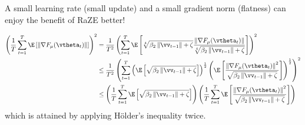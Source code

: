 


A small learning rate (small update) and a small gradient norm (flatness) can enjoy the benefit of RaZE better!


\begin{equation}
\begin{aligned}
\left(\frac{1}{T}\sum_{t=1}^T\E\left[\left\|\nabla
F_{\mu}(\vtheta_t)\right\|\right]\right)^2 &=\frac{1}{T^2}\left(\sum_{t=1}^T\E\left[\sqrt[4]{\beta_2\left\|\vv_{t-1}\right\|+\zeta}\frac{\left\|\nabla
F_{\mu}(\vtheta_t)\right\|}{\sqrt[4]{\beta_2\left\|\vv_{t-1}\right\|+\zeta}}\right]\right)^2 \\
&\leq \frac{1}{T^2}\left(\sum_{t=1}^T\left(\E\left[\sqrt{\beta_2\left\|\vv_{t-1}\right\|+\zeta}\right]\right)^{\frac{1}{2}}\left(\E\left[\frac{\left\|\nabla
F_{\mu}(\vtheta_t)\right\|^2}{\sqrt{\beta_2\left\|\vv_{t-1}\right\|+\zeta}}\right]\right)^{\frac{1}{2}}\right)^2 \\
&\leq \left(\frac{1}{T}\sum_{t=1}^T \E\left[\sqrt{\beta_2\left\|\vv_{t-1}\right\|+\zeta}\right]\right)\left(\frac{1}{T}\sum_{t=1}^T\E\left[\frac{\left\|\nabla
F_{\mu}(\vtheta_t)\right\|^2}{\sqrt{\beta_2\left\|\vv_{t-1}\right\|+\zeta}}\right]\right)
\end{aligned}
\end{equation}
which is attained by applying H\"{o}lder's inequality twice.

